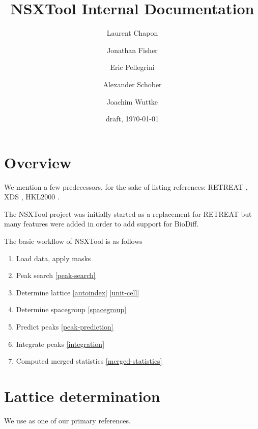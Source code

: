 \documentclass[twocolumn,preprintnumbers,amsmath,amssymb]{revtex4}
\begin{document}
\title{NSXTool Internal Documentation}
\author{Laurent Chapon}
\author{Jonathan Fisher}
\author{Eric Pellegrini}
\author{Alexander Schober}
\author{Joachim Wuttke}

\date{draft, \today}


\maketitle

\section{Overview}
We mention a few predecessors, for the sake of listing references: RETREAT \cite{retreat-manual},
XDS \cite{xds-2010}, HKL2000 \cite{otwinowski-1997, denzo-scalepack, hkl2000-manual}.

The NSXTool project was initially started as a replacement for RETREAT but many features were added
in order to add support for BioDiff.

The basic workflow of NSXTool is as follows
\begin{enumerate}
  \item Load data, apply masks
  \item Peak search \ref{peak-search}
  \item Determine lattice \ref{autoindex} \ref{unit-cell}
  \item Determine spacegroup \ref{spacegroup}
  \item Predict peaks \ref{peak-prediction}
  \item Integrate peaks \ref{integration}
  \item Computed merged statistics \ref{merged-statistics}
\end{enumerate}

\section{Lattice determination}
We use \cite{crystal-lattices} as one of our primary references.
\end{document}
